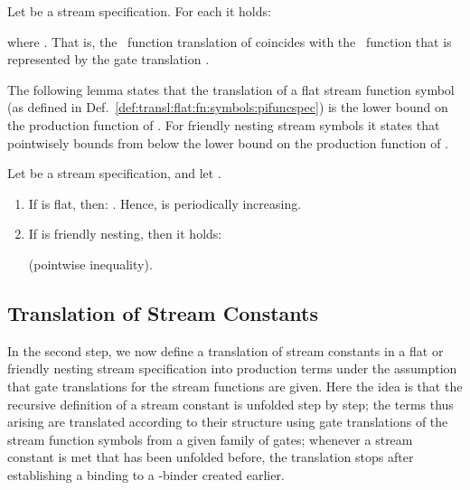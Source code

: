 \begin{proposition}\label{prop:corr:pein:gate:transl}
Let  be a stream specification.
  For each  it holds:

where .
  That is,
  the \pein~function translation  of\/ 
  coincides with the \pein~function that is represented by the
  gate translation .
\end{proposition}


The following lemma states that the translation 
of a flat stream function symbol  
(as defined in Def.~\ref{def:transl:flat:fn:symbols:pifuncspec})
is the \daob{} lower bound on the production function of .
For friendly nesting stream symbols  it states
that  pointwisely bounds from below
the \daob{} lower bound on the production function of .


\begin{lemma}\label{lem:transl:soundness}
  Let  be a stream specification,
  and let\/ .
\begin{enumerate}
    \item If\/  is flat, then:\/
      .
      Hence,  is periodically increasing.
    \item If\/  is friendly nesting, then it holds:\/
      
      (pointwise inequality).
  \end{enumerate}
\end{lemma}




\subsection{Translation of Stream Constants}
  \label{sec:translation:subsec:constants}



In the second step, we now define a translation of
stream constants
in a flat or friendly nesting stream specification into production terms
under the assumption that gate translations for the stream functions are given.
Here the idea is that the recursive definition of a stream constant
 is unfolded step by step;
the terms thus arising are translated according to their
structure using gate translations of the stream function symbols
from a given family of gates;
whenever a stream constant is met that has been unfolded before,
the translation stops after establishing a binding to a -binder
created earlier.


